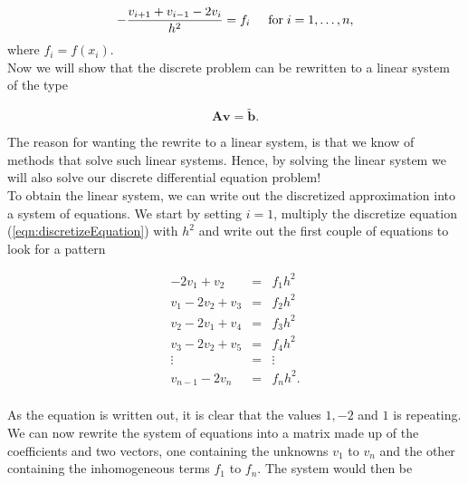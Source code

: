 \documentclass{article}
\begin{document}
\begin{equation}
-\frac{v_{i+1}+v_{i-1}-2v_i}{h^2} = f_i  \hspace{0.5cm} \mathrm{for} \hspace{0.1cm} i=1,\dots, n,
\label{eqn:discretizeEquation}
\end{equation}
where $f_i=f(x_i)$. \\

Now we will show that the discrete problem can be rewritten to a linear system of the type 

\begin{equation*}
\mathbf{A}\mathbf{v} = \tilde{\mathbf{b}}.
\end{equation*}

The reason for wanting the rewrite to a linear system, is that we know of methods that solve such linear systems. Hence, by solving the linear system we will also solve our discrete differential equation problem!\\

To obtain the linear system, we can write out the discretized approximation into a system of equations. We start by setting $i=1$, multiply the discretize equation (\ref{eqn:discretizeEquation}) with $h^2$ and write out the first couple of equations to look for a pattern

\begin{eqnarray}
\nonumber
-2v_1 + v_2 &=& f_1h^2 \\ \nonumber
v_1 - 2v_2 +v_3 &=& f_2h^2 \\ \nonumber
v_2 - 2v_1 +v_4 &=& f_3h^2 \\ \nonumber
v_3 - 2v_2 +v_5 &=& f_4h^2 \\ \nonumber
\vdots &=& \vdots \\ \nonumber
v_{n-1} - 2v_n &=& f_nh^2. \\ \nonumber
\end{eqnarray}

As the equation is written out, it is clear that the values $1, -2$ and $1$ is repeating. We can now rewrite the system of equations into a matrix made up of the coefficients and two vectors, one containing the unknowns $v_1$ to $v_{n}$ and the other containing the inhomogeneous terms $f_1$ to $f_{n}$. The system would then be 
\end{document}
